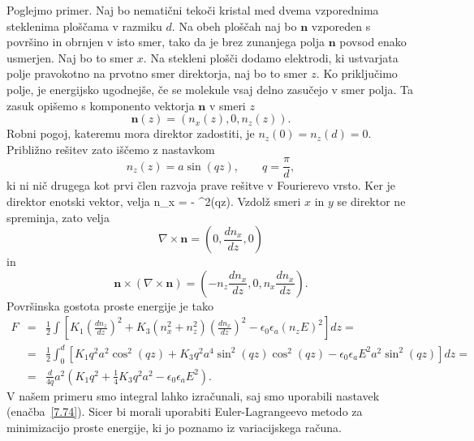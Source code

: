 Poglejmo primer. Naj bo nematični tekoči kristal med dvema vzporednima
steklenima ploščama v razmiku $d$. Na obeh ploščah naj bo $\mathbf{n}$ vzporeden
s površino in obrnjen v isto smer, tako da je brez zunanjega 
polja $\mathbf{n}$ povsod enako usmerjen. Naj bo to smer $x$.
Na stekleni plošči dodamo elektrodi, ki ustvarjata polje pravokotno na 
prvotno smer direktorja, naj bo to smer $z$.
Ko priključimo polje, je energijsko ugodnejše, če
se molekule vsaj delno zasučejo v smer polja. Ta zasuk opišemo s
komponento vektorja $\mathbf{n}$ v smeri $z$
\begin{equation}
\mathbf{n}(z)=(n_{x}(z),0,n_{z}(z)).
\label{7.73}
\end{equation}
Robni pogoj, kateremu mora direktor zadostiti,
je $n_{z}(0)=n_{z}(d)=0$. Približno rešitev zato iščemo z nastavkom 
\begin{equation}
n_{z}(z)=a\sin (qz), \qquad q=\frac{\pi}{d},
\label{7.74}
\end{equation}
ki ni nič drugega kot prvi člen razvoja prave rešitve v Fourierevo vrsto.
Ker je direktor enotski vektor, velja
\beq
n_x =   - \sin^2(qz).
\eeq
Vzdolž smeri $x$ in $y$ se direktor ne spreminja, zato velja
\begin{equation}
\nabla\times\mathbf{n}=(0,\frac{dn_{x}}{dz},0)
\label{7.75}
\end{equation}
 in 
\begin{equation}
\mathbf{n}\times(\nabla\times\mathbf{n})=(-n_{z}\frac{dn_{x}}{dz},0,
n_{x}\frac{dn_{x}}{dz}).
\label{7.76}
\end{equation}
Površinska gostota proste energije je tako 
\begin{eqnarray}
F & = & \frac{1}{2}\int\left[K_{1}\left(\frac{dn_{z}}{dz}\right)^{2}+K_{3}(n_x^2+n_{z}^{2})
\left(\frac{dn_{x}}{dz}\right)^{2}-
\epsilon_{0}\epsilon_{a}(n_{z}E)^{2}\right]dz=\nonumber \\
 & = & \frac{1}{2}\int_{0}^{d}
 [K_{1}q^{2}a^{2}\cos^{2}(qz)+K_{3}q^{2}a^{4}\sin^{2}(qz)\cos^2(qz)-
 \epsilon_{0}\epsilon_{a}E^2a^{2}\sin^{2}(qz)]dz=\nonumber \\
 & = & \frac{d}{4q}a^2\left( K_{1}q^{2}+\frac{1}{4}K_{3}q^{2}a^2-\epsilon_{0}\epsilon_{a}E^2\right).
\end{eqnarray}
V našem primeru smo integral lahko izračunali, saj smo uporabili nastavek (enačba~\ref{7.74}).
Sicer bi morali uporabiti Euler-Lagrangeevo metodo za minimizacijo proste energije, ki 
jo poznamo iz variacijskega računa.


